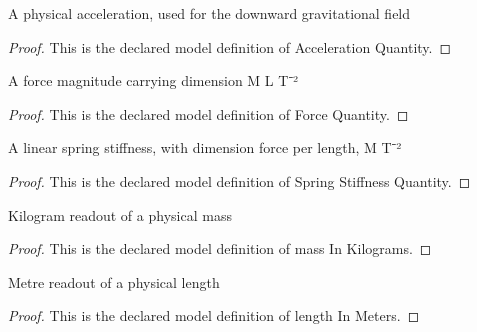 \begin{definition}
  \label{def:physics:phyx-mini-0396:phyxminiproblems-problemphyxmini0396-accelerationquantity}
  A physical acceleration, used for the downward gravitational field
\end{definition}
\begin{proof}
  This is the declared model definition of Acceleration Quantity.
\end{proof}
\begin{definition}
  \label{def:physics:phyx-mini-0396:phyxminiproblems-problemphyxmini0396-forcequantity}
  A force magnitude carrying dimension M L T⁻²
\end{definition}
\begin{proof}
  This is the declared model definition of Force Quantity.
\end{proof}
\begin{definition}
  \label{def:physics:phyx-mini-0396:phyxminiproblems-problemphyxmini0396-springstiffnessquantity}
  A linear spring stiffness, with dimension force per length, M T⁻²
\end{definition}
\begin{proof}
  This is the declared model definition of Spring Stiffness Quantity.
\end{proof}
\begin{definition}
  \label{def:physics:phyx-mini-0396:phyxminiproblems-problemphyxmini0396-massinkilograms}
  Kilogram readout of a physical mass
\end{definition}
\begin{proof}
  This is the declared model definition of mass In Kilograms.
\end{proof}
\begin{definition}
  \label{def:physics:phyx-mini-0396:phyxminiproblems-problemphyxmini0396-lengthinmeters}
  Metre readout of a physical length
\end{definition}
\begin{proof}
  This is the declared model definition of length In Meters.
\end{proof}
